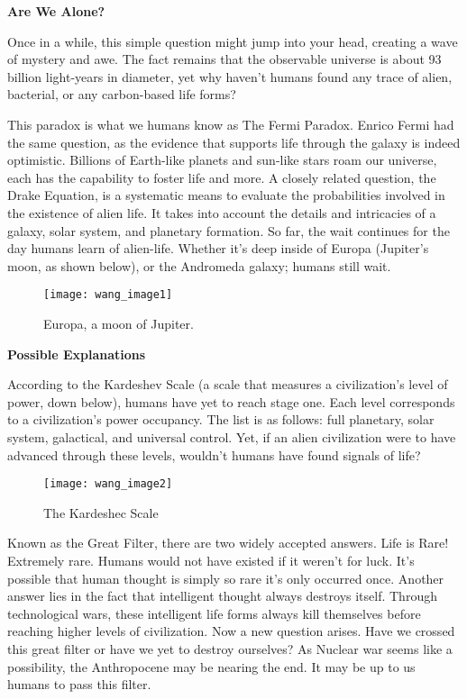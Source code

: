 
\noindent
\textbf{Are We Alone?}

Once in a while, this simple question might jump into your head, creating a wave of mystery and awe. The fact remains that the observable universe is about 93 billion light-years in diameter, yet why haven’t humans found any trace of alien, bacterial, or any carbon-based life forms?

This paradox is what we humans know as The Fermi Paradox. Enrico Fermi had the same question, as the evidence that supports life through the galaxy is indeed optimistic. Billions of Earth-like planets and sun-like stars roam our universe, each has the capability to foster life and more. A closely related question, the Drake Equation, is a systematic means to evaluate the probabilities involved in the existence of alien life. It takes into account the details and intricacies of a galaxy, solar system, and planetary formation. So far, the wait continues for the day humans learn of alien-life. Whether it’s deep inside of Europa (Jupiter’s moon, as shown below), or the Andromeda galaxy; humans still wait.

\renewcommand{\thefigure}{1}
\begin{figure}[h]
  \begin{center}
    \texttt{[image: wang\_image1]}
  \end{center}
  \caption{Europa, a moon of Jupiter.}
  \label{fig:1}
\end{figure}

\noindent
\textbf{Possible Explanations}

According to the Kardeshev Scale (a scale that measures a civilization’s level of power, down below), humans have yet to reach stage one. Each level corresponds to a civilization’s power occupancy. The list is as follows: full planetary, solar system, galactical, and universal control. Yet, if an alien civilization were to have advanced through these levels, wouldn’t humans have found signals of life? 

\begin{figure}[htp]
    \centering
    \texttt{[image: wang\_image2]}
    \caption{The Kardeshec Scale}
    \label{fig:2}
\end{figure}

Known as the Great Filter, there are two widely accepted answers. Life is Rare! Extremely rare. Humans would not have existed if it weren’t for luck. It’s possible that human thought is simply so rare it’s only occurred once. Another answer lies in the fact that intelligent thought always destroys itself. Through technological wars, these intelligent life forms always kill themselves before reaching higher levels of civilization. Now a new question arises. Have we crossed this great filter or have we yet to destroy ourselves? As Nuclear war seems like a possibility, the Anthropocene may be nearing the end. It may be up to us humans to pass this filter.
